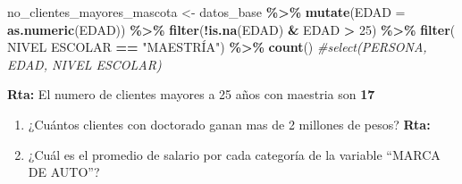\documentclass[
]{article}
\newenvironment{Shaded}{\begin{snugshade}}{\end{snugshade}}
\newcommand{\AttributeTok}[1]{\textcolor[rgb]{0.13,0.29,0.53}{#1}}
\newcommand{\CommentTok}[1]{\textcolor[rgb]{0.56,0.35,0.01}{\textit{#1}}}
\newcommand{\DecValTok}[1]{\textcolor[rgb]{0.00,0.00,0.81}{#1}}
\newcommand{\FunctionTok}[1]{\textcolor[rgb]{0.13,0.29,0.53}{\textbf{#1}}}
\newcommand{\NormalTok}[1]{#1}
\newcommand{\OtherTok}[1]{\textcolor[rgb]{0.56,0.35,0.01}{#1}}
\newcommand{\SpecialCharTok}[1]{\textcolor[rgb]{0.81,0.36,0.00}{\textbf{#1}}}
\newcommand{\StringTok}[1]{\textcolor[rgb]{0.31,0.60,0.02}{#1}}
\providecommand{\tightlist}{%
  \setlength{\itemsep}{0pt}\setlength{\parskip}{0pt}}
\begin{document}
\begin{Shaded}
\begin{Highlighting}[]
\NormalTok{no\_clientes\_mayores\_mascota }\OtherTok{\textless{}{-}}\NormalTok{ datos\_base }\SpecialCharTok{\%\textgreater{}\%} 
  \FunctionTok{mutate}\NormalTok{(}\AttributeTok{EDAD =} \FunctionTok{as.numeric}\NormalTok{(EDAD)) }\SpecialCharTok{\%\textgreater{}\%} 
  \FunctionTok{filter}\NormalTok{(}\SpecialCharTok{!}\FunctionTok{is.na}\NormalTok{(EDAD) }\SpecialCharTok{\&}\NormalTok{ EDAD }\SpecialCharTok{\textgreater{}} \DecValTok{25}\NormalTok{) }\SpecialCharTok{\%\textgreater{}\%} 
  \FunctionTok{filter}\NormalTok{( }\StringTok{\textasciigrave{}}\AttributeTok{NIVEL ESCOLAR}\StringTok{\textasciigrave{}} \SpecialCharTok{==} \StringTok{"MAESTRÍA"}\NormalTok{) }\SpecialCharTok{\%\textgreater{}\%}
  \FunctionTok{count}\NormalTok{()}
    \CommentTok{\#select(PERSONA, EDAD, \textasciigrave{}NIVEL ESCOLAR\textasciigrave{})}
\end{Highlighting}
\end{Shaded}

\textbf{Rta: } El numero de clientes mayores a 25 años con maestria son
\textbf{17}

\begin{enumerate}
\def\labelenumi{\alph{enumi}.}
\setcounter{enumi}{2}
\tightlist
\item
  ¿Cuántos clientes con doctorado ganan mas de 2 millones de pesos?
  \textbf{Rta: }
\item
  ¿Cuál es el promedio de salario por cada categoría de la variable
  ``MARCA DE AUTO''?
\end{enumerate}
\end{document}
